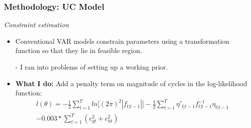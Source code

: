 \documentclass[10pt]{beamer}
\begin{document}
\begin{frame}
	\frametitle{Methodology: UC Model}
			\textit{Constraint estimation}
			\begin{itemize}
				\item Conventional VAR models constrain parameters using a transformation function so that they lie in feasible region.
				\item[-] I ran into problems of setting up a working prior.
			\end{itemize}
		
			\begin{itemize}
			\item \textbf{What I do:} Add a penalty term on magnitude of cycles in the log-likelihood function:
			 \begin{align*}
				l(\theta) = -\frac{1}{2}\sum_{t=1}^{T}ln\lbrack(2\pi)^2|f_{t|t-1}|\rbrack
				-\frac{1}{2}\sum_{t=1}^{T}\eta'_{t|t-1}f^{-1}_{t|t-1}\eta_{t|t-1}
				\\ - 0.003*\sum_{t=1}^{T}(c_{yt}^2+c_{ht}^2)
			\end{align*}
		\end{itemize}
	
	
	
	
\end{frame}
\end{document}
